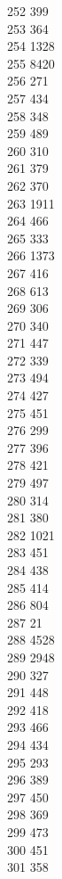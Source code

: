{ 252	399 \\
 253	364 \\
 254	1328 \\
 255	8420 \\
 256	271 \\
 257	434 \\
 258	348 \\
 259	489 \\
 260	310 \\
 261	379 \\
 262	370 \\
 263	1911 \\
 264	466 \\
 265	333 \\
 266	1373 \\
 267	416 \\
 268	613 \\
 269	306 \\
 270	340 \\
 271	447 \\
 272	339 \\
 273	494 \\
 274	427 \\
 275	451 \\
 276	299 \\
 277	396 \\
 278	421 \\
 279	497 \\
 280	314 \\
 281	380 \\
 282	1021 \\
 283	451 \\
 284	438 \\
 285	414 \\
 286	804 \\
 287	21 \\
 288	4528 \\
 289	2948 \\
 290	327 \\
 291	448 \\
 292	418 \\
 293	466 \\
 294	434 \\
 295	293 \\
 296	389 \\
 297	450 \\
 298	369 \\
 299	473 \\
 300	451 \\
 301	358 \\
}

